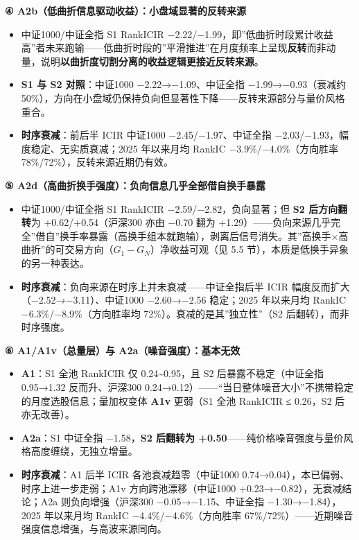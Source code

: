 \documentclass[UTF8,a4paper,zihao=-4,fontset=windows]{ctexart}
\providecommand{\tightlist}{\setlength{\itemsep}{0pt}\setlength{\parskip}{0pt}}
\begin{document}
\textbf{④ A2b（低曲折信息驱动收益）：小盘域显著的反转来源}

\begin{itemize}
\tightlist
\item
  中证1000/中证全指 S1 RankICIR
  −2.22/−1.99，即''低曲折时段累计收益高''者未来跑输------低曲折时段的''平滑推进''在月度频率上呈现\textbf{反转}而非动量，说明\textbf{以曲折度切割分离的收益逻辑更接近反转来源}。
\item
  \textbf{S1 与 S2 对照}：中证1000 −2.22→−1.09、中证全指
  −1.99→−0.93（衰减约
  50\%），方向在小盘域仍保持负向但显著性下降------反转来源部分与量价风格重合。
\item
  \textbf{时序衰减}：前后半 ICIR 中证1000 −2.45/−1.97、中证全指
  −2.03/−1.93，幅度稳定、无实质衰减；2025 年以来月均 RankIC
  −3.9\%/−4.0\%（方向胜率 78\%/72\%），反转来源近期仍有效。
\end{itemize}

\textbf{⑤ A2d（高曲折换手强度）：负向信息几乎全部借自换手暴露}

\begin{itemize}
\tightlist
\item
  中证1000/中证全指 S1 RankICIR −2.59/−2.82，负向显著；但 \textbf{S2
  后方向翻转}为 +0.62/+0.54（沪深300 亦由 −0.70 翻为
  +1.29）------负向来源几乎完全''借自''换手率暴露（高换手组本就跑输），剥离后信号消失。其''高换手×高曲折''的可交易方向（\(G_1-G_N\)）净收益可观（见
  5.5 节），本质是低换手异象的另一种表达。
\item
  \textbf{时序衰减}：负向来源在时序上并未衰减------中证全指后半 ICIR
  幅度反而扩大（−2.52→−3.11）、中证1000 −2.60→−2.56 稳定；2025
  年以来月均 RankIC −6.3\%/−8.9\%（方向胜率均
  72\%）。衰减的是其''独立性''（S2 后翻转），而非时序强度。
\end{itemize}

\textbf{⑥ A1/A1v（总量层）与 A2a（噪音强度）：基本无效}

\begin{itemize}
\tightlist
\item
  \textbf{A1}：S1 全池 RankICIR 仅 0.24\textasciitilde0.95，且 S2
  后暴露不稳定（中证全指 0.95→1.32 反而升、沪深300
  0.24→0.12）------``当日整体噪音大小''不携带稳定的月度选股信息；量加权变体
  \textbf{A1v} 更弱（S1 全池 \textbar RankICIR\textbar{} ≤ 0.26，S2
  后亦无改善）。
\item
  \textbf{A2a}：S1 中证全指 −1.58，\textbf{S2 后翻转为
  +0.50}------纯价格噪音强度与量价风格高度缠绕，无独立增量。
\item
  \textbf{时序衰减}：A1 后半 ICIR 各池衰减趋零（中证1000
  0.74→0.04），本已偏弱、时序上进一步走弱；A1v 方向跨池漂移（中证1000
  +0.23→−0.82），无衰减结论；A2a 则负向增强（沪深300
  −0.05→−1.15、中证全指 −1.30→−1.84），2025 年以来月均 RankIC
  −4.4\%/−4.6\%（方向胜率
  67\%/72\%）------近期噪音强度信息增强，与高波来源同向。
\end{itemize}
\end{document}
